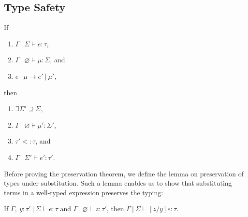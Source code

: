\documentclass{llncs}
\begin{document}
\newpage

\subsection{Type Safety}


\begin{theorem}[Preservation]
If
\begin{enumerate}
\item $\Gamma~|~\Sigma \vdash e : \tau$,
\item $\Gamma~|~\varnothing \vdash \mu : \Sigma$, and
\item $e~|~\mu \rightarrow e'~|~\mu'$,
\end{enumerate}
then
\begin{enumerate}
\item $\exists \Sigma' \supseteq \Sigma$,
\item $\Gamma~|~\varnothing \vdash \mu' : \Sigma'$,
\item $\tau'<:\tau$, and
\item $\Gamma~|~\Sigma' \vdash e' : \tau'$.
\end{enumerate}

\end{theorem}

Before proving the preservation theorem, we define the lemma on preservation of types under substitution. Such a lemma enables us to show that substituting terms in a well-typed expression preserves the typing:


\begin{lemma}
If $\Gamma,~y : \tau'~|~\Sigma \vdash e : \tau$ and $\Gamma~|~\varnothing \vdash z : \tau'$, then $\Gamma~|~\Sigma \vdash [z/y]e : \tau$.
\end{lemma}
\end{document}
